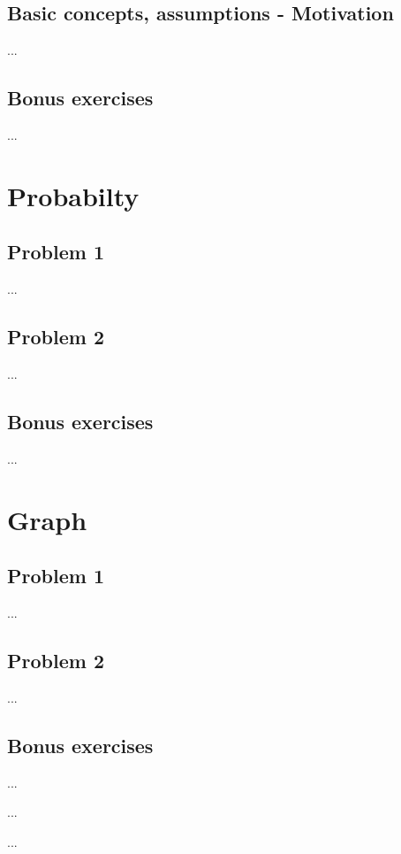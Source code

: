 \documentclass[a4paper]{article}
\begin{document}
	\subsection{Basic concepts, assumptions - Motivation}
	...

	\subsection{Bonus exercises}
	...

\section{Probabilty}
	\subsection{Problem 1}
	...
	
	\subsection{Problem 2}
	...

	\subsection{Bonus exercises}
	...



\section{Graph}
	\subsection{Problem 1}
	...
	
	\subsection{Problem 2}
	...

	\subsection{Bonus exercises}
	...

\begin{thebibliography}{80}


...


...


\end{thebibliography}
\end{document}
